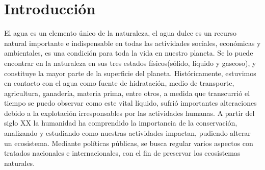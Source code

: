 

\chapter[Introducción]{Introducción}
\pagestyle{fancy}


El agua es un elemento \'unico de la naturaleza, \cite{caribbean_seguridad_2020} el agua dulce es un recurso natural importante e indispensable en todas las actividades sociales, económicas y ambientales, es una condición para toda la vida en nuestro planeta.
Se lo puede encontrar en la naturaleza en sus tres estados f\'isicos(sólido, l\'iquido y gaseoso), y constituye la  mayor parte de la superficie del planeta.
Hist\'oricamente, estuvimos en contacto con el agua como fuente de hidratación, medio de transporte, agricultura, ganadería, materia prima, entre otros, a medida que transcurrió el tiempo se puedo observar como este vital líquido, sufrió importantes alteraciones debido a la explotación irresponsables por las actividades humanas. 
A partir del siglo XX la humanidad ha comprendido la importancia de la conservación, analizando y estudiando como nuestras actividades impactan, pudiendo alterar un ecosistema.
Mediante pol\'iticas p\'ublicas, se busca regular varios aspectos con tratados nacionales e internacionales, con el fin de preservar los ecosistemas naturales.

